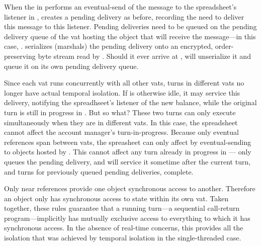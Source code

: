 \documentclass{llncs}
\begin{document}
When the  in  performs an eventual-send of
the  message to the spreadsheet's listener in
,  creates a pending delivery as before, recording the
need to deliver this message to this listener. Pending deliveries need
to be queued on the pending delivery queue of the vat hosting the
object that will receive the message---in this case, . 
serializes (marshals) the pending delivery onto an encrypted,
order-preserving byte stream read by . Should it ever arrive at
,  will unserialize it and queue it on its own pending
delivery queue.

Since each vat runs concurrently with all other vats, turns in
different vats no longer have actual temporal isolation. If  is
otherwise idle, it may service this delivery, notifying the
spreadhseet's listener of the new balance, while the original turn is
still in progress in . But so what? These two turns can only
execute simultaneously when they are in different vats. In this case,
the spreadsheet cannot affect the account manager's
turn-in-progress. Because only eventual references span between vats,
the spreasheet can only affect  by eventual-sending to objects
hosted by . This cannot affect any turn already in progress in
--- only queues the pending delivery, and will service
it sometime after the current turn, and turns for previously queued
pending deliveries, complete.

Only near references provide one object synchronous access to
another. Therefore an object only has synchronous access to state
within its own vat. Taken together, these rules guarantee that a
running turn---a sequential call-return program---implicitly has
mutually exclusive access to everything to which it has synchronous
access. In the absence of real-time concerns, this provides all the
isolation that was achieved by temporal isolation in the
single-threaded case.
\end{document}
